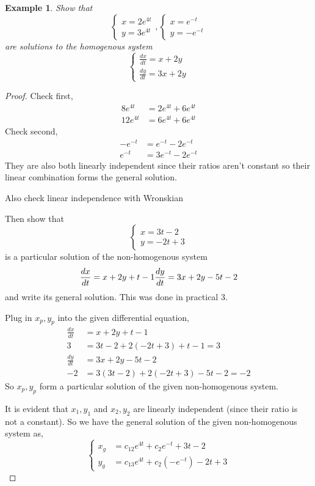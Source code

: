 \documentclass[oneside,11pt,pdftex,final]{book}%
\numberwithin{equation}{section}
\newtheorem{example}[theorem]{Example}
\numberwithin{section}{chapter}
\numberwithin{equation}{chapter}
\begin{document}
\begin{example}
	Show that \[ \begin{cases}
		x=2e^{4t}\\
		y=3e^{4t}
	\end{cases}, \begin{cases}
	x=e^{-t}\\
	y=-e^{-t}
\end{cases}\] are solutions to the homogenous system \[ \begin{cases}
\frac{dx}{dt}=x+2y\\
\frac{dy}{dt}=3x+2y
\end{cases} \]
\end{example}
\begin{proof}
	Check first,
	\begin{align*}
		8e^{4t}&=2e^{4t}+6e^{4t}\\
		12e^{4t}&=6e^{4t}+6e^{4t}
	\end{align*}
	Check second,
	\begin{align*}
		-e^{-t}&=e^{-t}-2e^{-t}\\
		e^{-t}&=3e^{-t}-2e^{-t}
	\end{align*}
	They are also both linearly independent since their ratios aren't constant so their linear combination forms the general solution.
	
	Also check linear independence with Wronskian
	
	Then show that \[ \begin{cases}
		x=3t-2\\
		y=-2t+3
	\end{cases} \] is a particular solution of the non-homogenous system 
\[ \frac{dx}{dt}=x+2y+t-1\\
\frac{dy}{dt}=3x+2y-5t-2 \] and write its general solution. This was done in practical 3.

Plug in $ x_p,y_p $ into the given differential equation,
\begin{align*}
	\frac{dx}{dt}&=x+2y+t-1\\
	3&=3t-2+2(-2t+3)+t-1=3\\
	\frac{dy}{dt}&=3x+2y-5t-2\\
	-2&=3(3t-2)+2(-2t+3)-5t-2=-2
\end{align*}
So $ x_p,y_p $ form a particular solution of the given non-homogenous system.

It is evident that $ x_1,y_1 $ and $ x_2,y_2 $ are linearly independent (since their ratio is not a constant). So we have the general solution of the given non-homogenous system as,
\[ \begin{cases}
	x_g&=c_12e^{4t}+c_2e^{-t}+3t-2\\
	y_g&=c_13e^{4t}+c_2(-e^{-t})-2t+3
\end{cases} \]
\end{proof}
\end{document}
